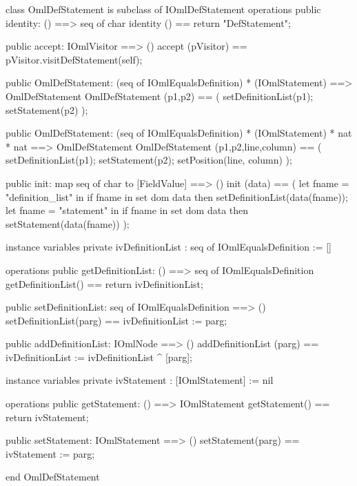 \begin{vdm_al}
class OmlDefStatement is subclass of IOmlDefStatement
operations
  public identity: () ==> seq of char
  identity () == return "DefStatement";

  public accept: IOmlVisitor ==> ()
  accept (pVisitor) == pVisitor.visitDefStatement(self);

  public OmlDefStatement:
    (seq of IOmlEqualsDefinition) *
    (IOmlStatement) ==> OmlDefStatement
  OmlDefStatement (p1,p2) == 
    ( setDefinitionList(p1);
      setStatement(p2) );

  public OmlDefStatement:
    (seq of IOmlEqualsDefinition) *
    (IOmlStatement) *
    nat *
    nat ==> OmlDefStatement
  OmlDefStatement (p1,p2,line,column) == 
    ( setDefinitionList(p1);
      setStatement(p2);
      setPosition(line, column) );

  public init: map seq of char to [FieldValue] ==> ()
  init (data) ==
    ( let fname = "definition_list" in
        if fname in set dom data
        then setDefinitionList(data(fname));
      let fname = "statement" in
        if fname in set dom data
        then setStatement(data(fname)) );

instance variables
  private ivDefinitionList : seq of IOmlEqualsDefinition := []

operations
  public getDefinitionList: () ==> seq of IOmlEqualsDefinition
  getDefinitionList() == return ivDefinitionList;

  public setDefinitionList: seq of IOmlEqualsDefinition ==> ()
  setDefinitionList(parg) == ivDefinitionList := parg;

  public addDefinitionList: IOmlNode ==> ()
  addDefinitionList (parg) == ivDefinitionList := ivDefinitionList ^ [parg];

instance variables
  private ivStatement : [IOmlStatement] := nil

operations
  public getStatement: () ==> IOmlStatement
  getStatement() == return ivStatement;

  public setStatement: IOmlStatement ==> ()
  setStatement(parg) == ivStatement := parg;

end OmlDefStatement
\end{vdm_al}

